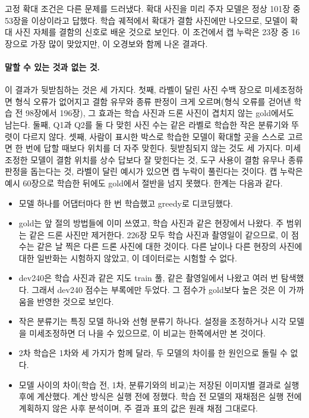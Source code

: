 \documentclass[11pt]{article}
\begin{document}
고정 확대 조건은 다른 문제를 드러냈다. 확대 사진을 미리 주자 모델은 정상 101장 중 53장을 이상이라고 답했다. 학습 궤적에서 확대가 결함 사진에만 나오므로, 모델이 확대 사진 자체를 결함의 신호로 배운 것으로 보인다. 이 조건에서 캡 누락은 23장 중 16장으로 가장 많이 맞았지만, 이 오경보와 함께 나온 결과다.

\paragraph{말할 수 있는 것과 없는 것.} 이 결과가 뒷받침하는 것은 세 가지다. 첫째, 라벨이 달린 사진 수백 장으로 미세조정하면 형식 오류가 없어지고 결함 유무와 종류 판정이 크게 오르며(형식 오류를 걷어낸 학습 전 98장에서 196장), 그 효과는 학습 사진과 드론 사진이 겹치지 않는 gold에서도 남는다. 둘째, Q1과 Q2를 둘 다 맞힌 사진 수는 같은 라벨로 학습한 작은 분류기와 뚜렷이 다르지 않다. 셋째, 사람이 표시한 박스로 학습한 모델이 확대할 곳을 스스로 고르면 한 번에 답할 때보다 위치를 더 자주 맞힌다. 뒷받침되지 않는 것도 세 가지다. 미세조정한 모델이 결함 위치를 상수 답보다 잘 맞힌다는 것, 도구 사용이 결함 유무나 종류 판정을 돕는다는 것, 라벨이 달린 예시가 있으면 캡 누락이 풀린다는 것이다. 캡 누락은 예시 60장으로 학습한 뒤에도 gold에서 절반을 넘지 못했다. 한계는 다음과 같다.
\begin{itemize}
  \item 모델 하나를 어댑터마다 한 번 학습했고 greedy로 디코딩했다.
  \item gold는 앞 절의 방법들에 이미 쓰였고, 학습 사진과 같은 현장에서 나왔다. 주 범위는 같은 드론 사진만 제거한다. 226장 모두 학습 사진과 촬영일이 같으므로, 이 점수는 같은 날 찍은 다른 드론 사진에 대한 것이다. 다른 날이나 다른 현장의 사진에 대한 일반화는 시험하지 않았고, 이 데이터로는 시험할 수 없다.
  \item dev240은 학습 사진과 같은 지도 train 풀, 같은 촬영일에서 나왔고 여러 번 탐색했다. 그래서 dev240 점수는 부록에만 두었다. 그 점수가 gold보다 높은 것은 이 가까움을 반영한 것으로 보인다.
  \item 작은 분류기는 특징 모델 하나와 선형 분류기 하나다. 설정을 조정하거나 시각 모델을 미세조정하면 더 나을 수 있으므로, 이 비교는 한쪽에서만 본 것이다.
  \item 2차 학습은 1차와 세 가지가 함께 달라, 두 모델의 차이를 한 원인으로 돌릴 수 없다.
  \item 모델 사이의 차이(학습 전, 1차, 분류기와의 비교)는 저장된 이미지별 결과로 실행 후에 계산했다. 계산 방식은 실행 전에 정했다. 학습 전 모델의 재채점은 실행 전에 계획하지 않은 사후 분석이며, 주 결과 표의 값은 원래 채점 그대로다.
\end{itemize}
\end{document}

